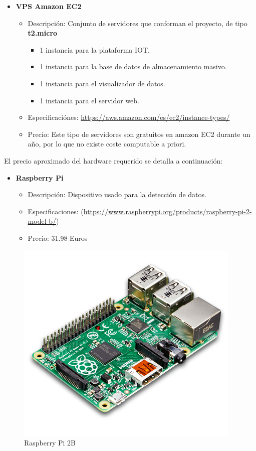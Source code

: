 {\begin{itemize}
 \item \textbf{VPS Amazon EC2}
 \begin{itemize}
  \item Descripción: Conjunto de servidores que conforman el proyecto, de tipo \textbf{t2.micro}
  \begin{itemize}
    \item 1 instancia para la plataforma IOT.
    \item 1 instancia para la base de datos de almacenamiento masivo.
    \item 1 instancia para el visualizador de datos.
    \item 1 instancia para el servidor web.
  \end{itemize}
  \item Especificaciónes: \url{https://aws.amazon.com/es/ec2/instance-types/}
  \item Precio: Este tipo de servidores son gratuitos en amazon EC2 durante un año, por lo que no existe coste computable a priori.
 \end{itemize}
\end{itemize}

\bigskip

El precio aproximado del hardware requerido se detalla a continuación:

\begin{itemize}
 \item \textbf{Raspberry Pi}
 \begin{itemize}
  \item Descripción: Dispositivo usado para la detección de datos.
  \item Especificaciones:  (\url{https://www.raspberrypi.org/products/raspberry-pi-2-model-b/})
  \item Precio: 31.98 Euros
 \end{itemize}
\end{itemize}
\begin{figure}[!h]
  \begin{center}
    \includegraphics[scale=0.30]{../images/hardware/pi.png}
    \caption{Raspberry Pi 2B}
    \label{fig:rpi}
  \end{center}
\end{figure}

}
